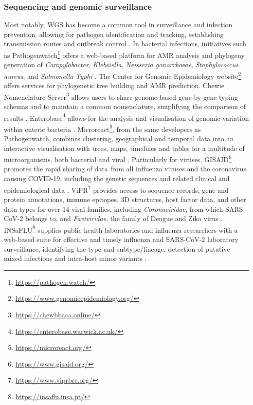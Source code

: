 \subsubsection{Sequencing and genomic surveillance} \label{sssec:_intro_sequencing_genomic_survaillance}

Most notably, WGS has become a common tool in surveillance and infection prevention, allowing for pathogen identification and tracking, establishing transmission routes and outbreak control \citep{lo_genomics_2020}. 
In bacterial infections, initiatives such as Pathogenwatch\footnote{\url{https://pathogen.watch/}} offers a web-based platform for \ac{AMR} analysis and phylogeny generation of \textit{Campylobacter}, \textit{Klebsiella}, \textit{Neisseria gonorrhoeae}, \textit{Staphylococcus aureus}, and \textit{Salmonella Typhi} \citep{afolayan_overcoming_2021}. 
The Center for Genomic Epidemiology website\footnote{\url{https://www.genomicepidemiology.org/}} offers services for phylogenetic tree building and \ac{AMR} prediction. 
Chewie Nomenclature Server\footnote{\url{https://chewbbaca.online/}} allows users to share genome-based gene-by-gene typing schemas and to maintain a common nomenclature, simplifying the comparison of results \citep{mamede_chewie_2021}. 
Enterobase\footnote{\url{https://enterobase.warwick.ac.uk/}} allows for the analysis and visualisation of genomic variation within enteric bacteria \citep{zhou_enterobase_2020}. 
Microreact\footnote{\url{https://microreact.org/}}, from the same developers as Pathogenwatch, combines clustering, geographical and temporal data into an interactive visualisation with trees, maps, timelines and tables for a multitude of microorganisms, both bacterial and viral \citep{argimon_microreact_nodate}. 
Particularly for viruses, GISAID\footnote{\url{https://www.gisaid.org/}}  promotes the rapid sharing of data from all influenza viruses and the coronavirus causing COVID-19, including the genetic sequences and related clinical and epidemiological data \citep{shu_gisaid_2017}. 
ViPR\footnote{\url{https://www.viprbrc.org/}} provides access to sequence records, gene and protein annotations, immune epitopes, 3D structures, host factor data, and other data types for over 14 viral families, including \textit{Coronaviridae}, from which \ac{SARS-CoV-2} belongs to, and \textit{Faviviridae}, the family of Dengue and Zika virus \citep{pickett_virus_2012}. 
INSaFLU\footnote{\url{https://insaflu.insa.pt/}} supplies public health laboratories and influenza researchers with a web-based suite for effective and timely influenza and \ac{SARS-CoV-2} laboratory surveillance, identifying the type and subtype/lineage, detection of putative mixed infections and intra-host minor variants \citep{borges_insaflu_2018}. 


